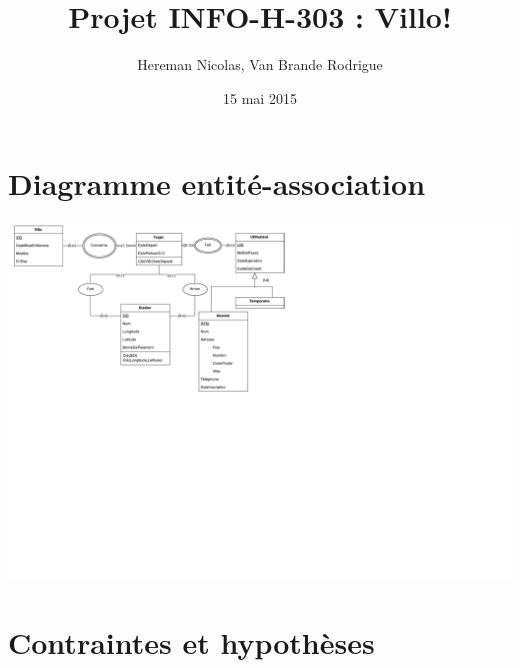 \documentclass[a4paper, 12pt]{report}
\title{Projet INFO-H-303 : Villo!}
\author{Hereman Nicolas, Van Brande Rodrigue}
\date{15 mai 2015}
\begin{document}
\maketitle 

\section*{Diagramme entité-association} %
	\includegraphics[scale=0.8]{entityassocdiagram.pdf}

\section*{Contraintes et hypothèses} %
\end{document}
